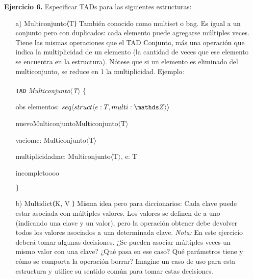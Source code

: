 \documentclass{article}
\newenvironment{tad}[1]{
	\paragraph{} \vspace*{-4mm}
	\newcommand{\obs}[2]{\texttt{obs} ##1 : ##2}

	\vspace{1ex}
	\texttt{TAD} \textit{#1} $\{$
	\par
	\tocarEspacios
}
{

\hspace{2.5mm} $\}$
\vspace{2ex}
}
\begin{document}
\textbf{Ejercicio 6.} Especificar TADs para las siguientes estructuras:
\begin{itemize}
    \item [a)] Multiconjunto⟨T⟩
    Tambi\'en conocido como multiset o bag. Es igual a un conjunto pero con duplicados: cada elemento puede agregarse
    m\'ultiples veces. Tiene las mismas operaciones que el TAD Conjunto, m\'as una operaci\'on que indica la multiplicidad de
    un elemento (la cantidad de veces que ese elemento se encuentra en la estructura). N\'otese que si un elemento es eliminado
    del multiconjunto, se reduce en 1 la multiplicidad. Ejemplo:
    \begin{tad}{Multiconjunto$\langle$T$\rangle$}
        obs elementos: $seq\langle struct\langle e: T, multi: \ent\rangle\rangle$
        
        \begin{proc}{nuevoMulticonjunto}{}{Multiconjunto$\langle$T$\rangle$}
        \end{proc}

        \begin{proc}{vacio}{\In mc: Multiconjunto$\langle$T$\rangle$}{\bool}
        \end{proc}

        \begin{proc}{multiplicidad}{\In mc: Multiconjunto$\langle$T$\rangle$, \In e: T}{\ent}
        \end{proc}
        incompletoooo
    \end{tad}




    \item [b)] Multidict⟨K, V ⟩
    Misma idea pero para diccionarios: Cada clave puede estar asociada con m\'ultiples valores. Los valores se definen de a uno
    (indicando una clave y un valor), pero la operaci\'on obtener debe devolver todos los valores asociados a una determinada
    clave.
    \textit{Nota:} En este ejercicio deber\'a tomar algunas decisiones. ¿Se pueden asociar m\'ultiples veces un mismo valor con una clave? ¿Qu\'e pasa en ese caso? Qu\'e par\'ametros tiene y c\'omo se comporta la operaci\'on borrar? Imagine un caso de uso para esta estructura y utilice su sentido com\'un para tomar estas decisiones.
\end{itemize}
\end{document}
